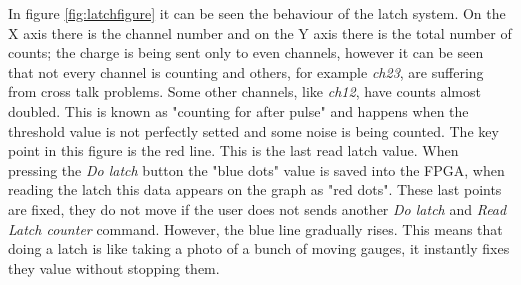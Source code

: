 \noindent In figure \ref{fig:latchfigure} it can be seen the behaviour of the latch system. On the X axis there is the channel number and on the Y axis there is the total number of counts; the charge is being sent only to even channels, however it can be seen that not every channel is counting and others, for example \textit{ch23}, are suffering from cross talk problems. Some other channels, like \textit{ch12}, have counts almost doubled. This is known as "counting for after pulse" and happens when the threshold value is not perfectly setted and some noise is being counted.
The key point in this figure is the red line. This is the last read latch value.
When pressing the \textit{Do latch} button the "blue dots" value is saved into the FPGA, when reading the latch this data appears on the graph as "red dots".
These last points are fixed, they do not move if the user does not sends another \textit{Do latch} and \textit{Read Latch counter} command. However, the blue line gradually rises.
This means that doing a latch is like taking a photo of a bunch of moving gauges, it instantly fixes they value without stopping them.  
